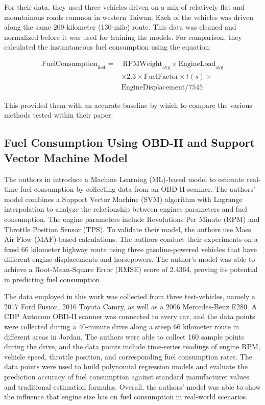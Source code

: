 \documentclass[letterpaper]{article}
\begin{document}
For their data, they used three vehicles driven on a mix of relatively flat and
mountainous roads common in western Taiwan. Each of the vehicles was driven
along the same 209-kilometer (130-mile) route. This data was cleaned and
normalized before it was used for training the models. For comparison, they
calculated the instantaneous fuel consumption using the equation: 

\[
\begin{aligned}
    \mathrm{FuelConsumption}_{\mathrm{inst}} =&~ \mathrm{RPMWeight}_{\mathrm{avg}}
    \times \mathrm{EngineLoad}_{\mathrm{avg}}\\
    &\times 2.3 \times \mathrm{FuelFactor}
    \times t(s)\times\\ 
    &\mathrm{EngineDisplacement}/7545  
\end{aligned}
\] 

\noindent
This provided them with an
accurate baseline by which to compare the various methods tested within their
paper.


\subsection*{Fuel Consumption Using OBD-II and Support Vector Machine Model}

The authors in \cite{abukhalil2020fuel} introduce a Machine Learning (ML)-based
model to estimate real-time fuel consumption by collecting data from an OBD-II
scanner. The authors’ model combines a Support Vector Machine (SVM) algorithm
with Lagrange interpolation to analyze the relationship between engines
parameters and fuel consumption. The engine parameters include Revolutions Per
Minute (RPM) and Throttle Position Sensor (TPS). To validate their model, the
authors use Mass Air Flow (MAF)-based calculations. The authors conduct their
experiments on a fixed 66 kilometer highway route using three gasoline-powered
vehicles that have different engine displacements and horsepowers. The author’s
model was able to achieve a Root-Mean-Square Error (RMSE) score of 2.4364,
proving its potential in predicting fuel consumption. 

The data employed in this
work was collected from three test-vehicles, namely a 2017 Ford Fusion, 2016
Toyota Camry, as well as a 2006 Mercedes-Benz E280. A CDP Autocom OBD-II scanner
was connected to every car, and the data points were collected during a
40-minute drive along a steep 66 kilometer route in different areas in Jordan.
The authors were able to collect 160 sample points during the drive, and the
data points include time-series readings of engine RPM, vehicle speed, throttle
position, and corresponding fuel consumption rates. The data points were used to
build polynomial regression models and evaluate the prediction accuracy of fuel
consumption against standard manufacturer values and traditional estimation
formulas. Overall, the authors’ model was able to show the influence that engine
size has on fuel consumption in real-world scenarios.
\end{document}
